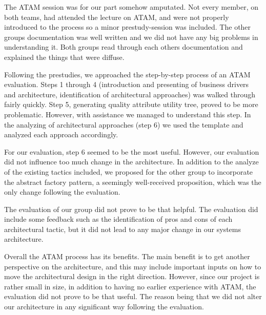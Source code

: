 The ATAM session was for our part somehow amputated. Not every member, on both teams, had attended the lecture on ATAM, and were not properly introduced to the process so a minor prestudy-session was included. The other groups documentation was well written and we did not have any big problems in understanding it. Both groups read through each others documentation and explained the things that were diffuse. 


Following the prestudies, we approached the step-by-step process of an ATAM evaluation. Steps 1 through 4 (introduction and presenting of business drivers and architecture, identification of architectural approaches) was walked through fairly quickly. Step 5, generating quality attribute utility tree, proved to be more problematic. However, with assistance we managed to understand this step. In the analyzing of architectural approaches (step 6) we used the template and analyzed each approach accordingly. 


For our evaluation, step 6 seemed to be the most useful. However, our evaluation did not influence too much change in the architecture. In addition to the analyze of the existing tactics included, we proposed for the other group to incorporate the abstract factory pattern, a seemingly well-received proposition, which was the only change following the evaluation.


The evaluation of our group did not prove to be that helpful. The evaluation did include some feedback such as the identification of pros and cons of each architectural tactic, but it did not lead to any major change in our systems architecture.  


Overall the ATAM process has its benefits. The main benefit is to get another perspective on the architecture, and this may include important inputs on how to move the architectural design in the right direction. However, since our project is rather small in size, in addition to having no earlier experience with ATAM, the evaluation did not prove to be that useful. The reason being that we did not alter our architecture in any significant way following the evaluation. 
